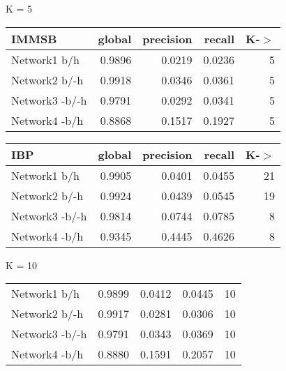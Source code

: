 

\begin{table*}[h] \label{table:unbalanced}
\caption{Predictive Performance on a UnBalanced Testing set}
	\begin{minipage}[h]{0.45\linewidth} 
K = 5\hspace{5pt}
\begin{tabular}{lrrrr}
\hline
 IMMSB   &   global &   precision &   recall &    K-\ensuremath{>} \\
\hline
 Network1 b/h          &   0.9896 &      0.0219 &   0.0236 & 5 \\
 Network2 b/-h       &   0.9918 &      0.0346 &   0.0361 & 5 \\
 Network3 -b/-h      &   0.9791 &      0.0292 &   0.0341 & 5 \\
 Network4 -b/h        &   0.8868 &      0.1517 &   0.1927 & 5 \\
\hline
\end{tabular}
\end{minipage}
\hspace{0.8cm}
\begin{minipage}[h]{0.45\linewidth}
\begin{tabular}{lrrrr}
\hline
 IBP    &   global &   precision &   recall &     K-\ensuremath{>} \\
\hline
 Network1 b/h        &   0.9905 &      0.0401 &   0.0455 & 21 \\
 Network2 b/-h     &   0.9924 &      0.0439 &   0.0545 & 19 \\
 Network3 -b/-h    &   0.9814 &      0.0744 &   0.0785 &  8 \\
 Network4 -b/h      &   0.9345 &      0.4445 &   0.4626 &  8 \\
\hline
\end{tabular}
\end{minipage}


	\begin{minipage}[h]{0.45\linewidth} 
K = 10
\begin{tabular}{lrrrr}

 Network1 b/h          &   0.9899 &      0.0412 &   0.0445 & 10 \\
 Network2 b/-h       &   0.9917 &      0.0281 &   0.0306 & 10 \\
 Network3 -b/-h      &   0.9791 &      0.0343 &   0.0369 & 10 \\
 Network4 -b/h        &   0.8880 &      0.1591 &   0.2057 & 10 \\
\hline
\end{tabular}
\end{minipage}
\hspace{0.8cm}
\begin{minipage}[h]{0.45\linewidth}
\begin{tabular}{lrrrr}


\end{tabular}
\end{minipage}
\end{table*}
